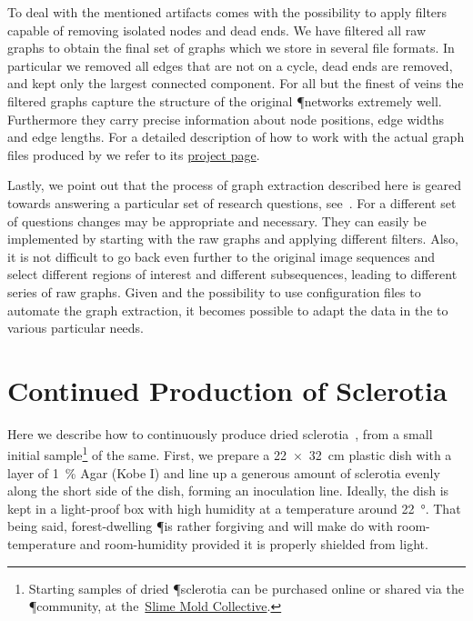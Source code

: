 		To deal with the mentioned artifacts \NEFI comes with the possibility to apply filters capable of removing isolated nodes and dead ends. We have filtered all raw graphs to obtain the final set of graphs which we store in several file formats. In particular we removed all edges that are not on a cycle, \ie dead ends are removed, and kept only the largest connected component. For all but the finest of veins the filtered graphs capture the structure of the original \P networks extremely well. Furthermore they carry precise information about node positions, edge widths and edge lengths. For a detailed description of how to work with the actual graph files produced by \NEFI we refer to its \href{http://nefi.mpi-inf.mpg.de}{project page}.

		Lastly, we point out that the process of graph extraction described here is geared towards answering a particular set of research questions, see~\cite{dirnberger2016}. For a different set of questions changes may be appropriate and necessary. They can easily be implemented by starting with the raw graphs and applying different filters. Also, it is not difficult to go back even further to the original image sequences and select different regions of interest and different subsequences, leading to different series of raw graphs. Given \NEFI and the possibility to use configuration files to automate the graph extraction, it becomes possible to adapt the data in the \data to various particular needs.

	\section{Continued Production of Sclerotia}\label{sec:sclerotia}

		Here we describe how to continuously produce dried sclerotia~\cite{lifecycle}, from a small initial sample\footnote{Starting samples of dried \P sclerotia can be purchased online or shared via the \P community, \eg at the~\href{http://slimoco.ning.com/}{Slime Mold Collective}.} of the same. First, we prepare a \SI{22 x 32}{\centi\metre} plastic dish with a layer of \SI{1}{\percent} Agar (Kobe I) and line up a generous amount of sclerotia evenly along the short side of the dish, forming an inoculation line. Ideally, the dish is kept in a light-proof box with high humidity at a temperature around \SI{22}{\degree}. That being said, forest-dwelling \P is rather forgiving and will make do with room-temperature and room-humidity provided it is properly shielded from light.

